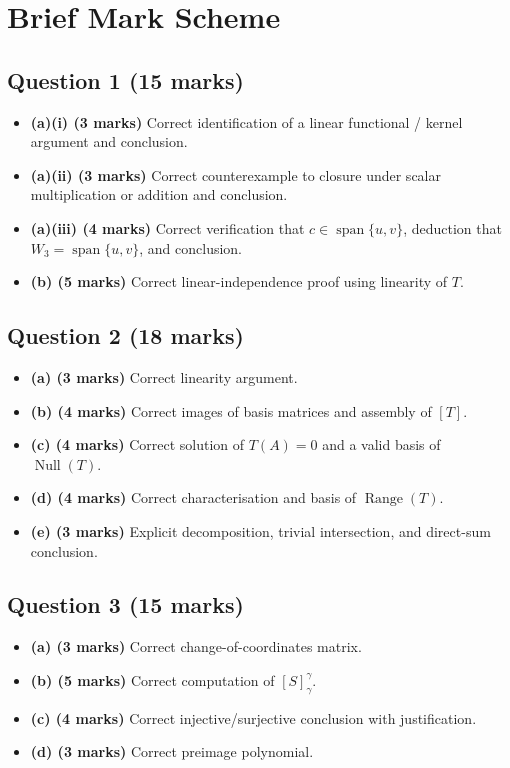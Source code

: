 \documentclass[12pt]{article}
\DeclareMathOperator{\Range}{Range}
\DeclareMathOperator{\Null}{Null}
\newcommand{\Span}{\operatorname{span}}
\begin{document}
\section{Brief Mark Scheme}

\subsection{Question 1 \hfill (15 marks)}
\begin{itemize}[leftmargin=1.6em]
\item \textbf{(a)(i) (3 marks)} Correct identification of a linear functional / kernel argument and conclusion.
\item \textbf{(a)(ii) (3 marks)} Correct counterexample to closure under scalar multiplication or addition and conclusion.
\item \textbf{(a)(iii) (4 marks)} Correct verification that \(c\in\Span\{u,v\}\), deduction that \(W_3=\Span\{u,v\}\), and conclusion.
\item \textbf{(b) (5 marks)} Correct linear-independence proof using linearity of \(T\).
\end{itemize}

\subsection{Question 2 \hfill (18 marks)}
\begin{itemize}[leftmargin=1.6em]
\item \textbf{(a) (3 marks)} Correct linearity argument.
\item \textbf{(b) (4 marks)} Correct images of basis matrices and assembly of \([T]\).
\item \textbf{(c) (4 marks)} Correct solution of \(T(A)=0\) and a valid basis of \(\Null(T)\).
\item \textbf{(d) (4 marks)} Correct characterisation and basis of \(\Range(T)\).
\item \textbf{(e) (3 marks)} Explicit decomposition, trivial intersection, and direct-sum conclusion.
\end{itemize}

\subsection{Question 3 \hfill (15 marks)}
\begin{itemize}[leftmargin=1.6em]
\item \textbf{(a) (3 marks)} Correct change-of-coordinates matrix.
\item \textbf{(b) (5 marks)} Correct computation of \([S]^\gamma_\gamma\).
\item \textbf{(c) (4 marks)} Correct injective/surjective conclusion with justification.
\item \textbf{(d) (3 marks)} Correct preimage polynomial.
\end{itemize}
\end{document}
